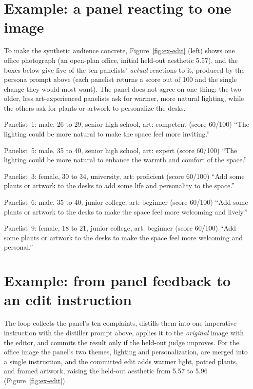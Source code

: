 \documentclass[10pt,twocolumn,letterpaper]{article}
\begin{document}
\section{Example: a panel reacting to one image}
\label{sup:panel-example}
To make the synthetic audience concrete, Figure~\ref{fig:ex-edit} (left) shows one office photograph (an open-plan office, initial held-out aesthetic 5.57), and the boxes below give five of the ten panelists' \emph{actual} reactions to it, produced by the persona prompt above (each panelist returns a score out of 100 and the single change they would most want). The panel does not agree on one thing: the two older, less art-experienced panelists ask for warmer, more natural lighting, while the others ask for plants or artwork to personalize the desks.

\begin{personabox}{Panelist~1: male, 26 to 29, senior high school, art: competent \quad(score 60/100)}
\small ``The lighting could be more natural to make the space feel more inviting.''
\end{personabox}
\begin{personabox}{Panelist~5: male, 35 to 40, senior high school, art: expert \quad(score 60/100)}
\small ``The lighting could be more natural to enhance the warmth and comfort of the space.''
\end{personabox}
\begin{personabox}{Panelist~3: female, 30 to 34, university, art: proficient \quad(score 60/100)}
\small ``Add some plants or artwork to the desks to add some life and personality to the space.''
\end{personabox}
\begin{personabox}{Panelist~6: male, 35 to 40, junior college, art: beginner \quad(score 60/100)}
\small ``Add some plants or artwork to the desks to make the space feel more welcoming and lively.''
\end{personabox}
\begin{personabox}{Panelist~9: female, 18 to 21, junior college, art: beginner \quad(score 60/100)}
\small ``Add some plants or artwork to the desks to make the space feel more welcoming and personal.''
\end{personabox}

\section{Example: from panel feedback to an edit instruction}
\label{sup:aggregation}
The loop collects the panel's ten complaints, distills them into one imperative instruction with the distiller prompt above, applies it to the \emph{original} image with the editor, and commits the result only if the held-out judge improves. For the office image the panel's two themes, lighting and personalization, are merged into a single instruction, and the committed edit adds warmer light, potted plants, and framed artwork, raising the held-out aesthetic from 5.57 to 5.96 (Figure~\ref{fig:ex-edit}).
\end{document}
